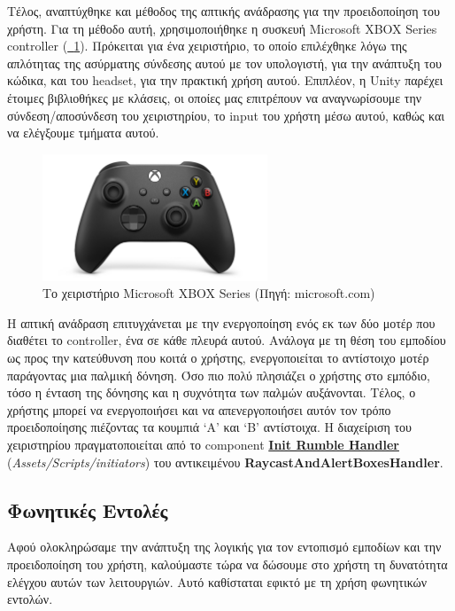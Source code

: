 Τέλος, αναπτύχθηκε και μέθοδος της απτικής ανάδρασης για την προειδοποίηση του χρήστη. Για τη μέθοδο αυτή, χρησιμοποιήθηκε η συσκευή Microsoft XBOX Series controller (\hyperref[fig:xboxController]{\schema~\ref*{fig:xboxController}}). Πρόκειται για ένα χειριστήριο, το οποίο επιλέχθηκε λόγω της απλότητας της ασύρματης σύνδεσης αυτού με τον υπολογιστή, για την ανάπτυξη του κώδικα, και του headset, για την πρακτική χρήση αυτού. 
Επιπλέον, η Unity παρέχει έτοιμες βιβλιοθήκες με κλάσεις, οι οποίες μας επιτρέπουν να αναγνωρίσουμε την σύνδεση/αποσύνδεση του χειριστηρίου, το input του χρήστη μέσω αυτού, καθώς και να ελέγξουμε τμήματα αυτού.
\begin{figure}[!h]
    \centering
    \includegraphics[width=0.6\textwidth]{images/xboxController.jpg}
    \caption{Το χειριστήριο Microsoft XBOX Series {\footnotesize(Πηγή: microsoft.com)}}\label{fig:xboxController}
\end{figure}
Η απτική ανάδραση επιτυγχάνεται με την ενεργοποίηση ενός εκ των δύο μοτέρ που διαθέτει το controller, ένα σε κάθε πλευρά αυτού. Ανάλογα με τη θέση του εμποδίου ως προς την κατεύθυνση που κοιτά ο χρήστης, ενεργοποιείται το αντίστοιχο μοτέρ παράγοντας μια παλμική δόνηση. Όσο πιο πολύ πλησιάζει ο χρήστης στο εμπόδιο, τόσο η ένταση της δόνησης και η συχνότητα των παλμών αυξάνονται. Τέλος, ο χρήστης μπορεί να ενεργοποιήσει και να απενεργοποιήσει αυτόν τον τρόπο προειδοποίησης πιέζοντας τα κουμπιά `A' και `B' αντίστοιχα. Η διαχείριση του χειριστηρίου πραγματοποιείται από το component \hyperref[lst:initRumbleHandler]{\textbf{Init Rumble Handler}} (\textit{Assets/Scripts/initiators}) του αντικειμένου \textbf{RaycastAndAlertBoxesHandler}.

\subsection{Φωνητικές Εντολές}\label{subsec:developVoiceCommands}
Αφού ολοκληρώσαμε την ανάπτυξη της λογικής για τον εντοπισμό εμποδίων και την προειδοποίηση του χρήστη, καλούμαστε τώρα να δώσουμε στο χρήστη τη δυνατότητα ελέγχου αυτών των λειτουργιών. Αυτό καθίσταται εφικτό με τη χρήση φωνητικών εντολών.

